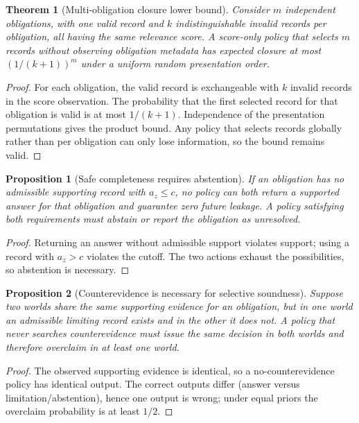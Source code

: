 \documentclass[12pt]{article}
\newtheorem{proposition}{Proposition}
\newtheorem{theorem}{Theorem}
\begin{document}
\begin{theorem}[Multi-obligation closure lower bound]
Consider $m$ independent obligations, with one valid record and $k$ indistinguishable invalid records per obligation, all having the same relevance score. A score-only policy that selects $m$ records without observing obligation metadata has expected closure at most $(1/(k+1))^m$ under a uniform random presentation order.
\end{theorem}
\begin{proof}
For each obligation, the valid record is exchangeable with $k$ invalid records in the score observation. The probability that the first selected record for that obligation is valid is at most $1/(k+1)$. Independence of the presentation permutations gives the product bound. Any policy that selects records globally rather than per obligation can only lose information, so the bound remains valid.
\end{proof}

\begin{proposition}[Safe completeness requires abstention]
If an obligation has no admissible supporting record with $a_z\le c$, no policy can both return a supported answer for that obligation and guarantee zero future leakage. A policy satisfying both requirements must abstain or report the obligation as unresolved.
\end{proposition}
\begin{proof}
Returning an answer without admissible support violates support; using a record with $a_z>c$ violates the cutoff. The two actions exhaust the possibilities, so abstention is necessary.
\end{proof}

\begin{proposition}[Counterevidence is necessary for selective soundness]
Suppose two worlds share the same supporting evidence for an obligation, but in one world an admissible limiting record exists and in the other it does not. A policy that never searches counterevidence must issue the same decision in both worlds and therefore overclaim in at least one world.
\end{proposition}
\begin{proof}
The observed supporting evidence is identical, so a no-counterevidence policy has identical output. The correct outputs differ (answer versus limitation/abstention), hence one output is wrong; under equal priors the overclaim probability is at least $1/2$.
\end{proof}
\end{document}
